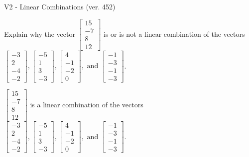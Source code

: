 \begin{exercise}
  \begin{exerciseTitle}V2 - Linear Combinations (ver. 452)\end{exerciseTitle}
  \begin{exerciseStatement}
    Explain why the vector \(\left[\begin{array}{c}
15 \\
-7 \\
8 \\
12
\end{array}\right]\)  is or is not a linear 
	combination of the vectors \(\left[\begin{array}{c}
-3 \\
2 \\
-4 \\
-2
\end{array}\right] , \left[\begin{array}{c}
-5 \\
1 \\
3 \\
-3
\end{array}\right] , \left[\begin{array}{c}
4 \\
-1 \\
-2 \\
0
\end{array}\right] , \text{ and } \left[\begin{array}{c}
-1 \\
-3 \\
-1 \\
-3
\end{array}\right]\).
	


  \end{exerciseStatement}
  \begin{exerciseAnswer}
   \(\left[\begin{array}{c}
15 \\
-7 \\
8 \\
12
\end{array}\right]\) 
  	 is  
	a linear combination of the vectors \(\left[\begin{array}{c}
-3 \\
2 \\
-4 \\
-2
\end{array}\right] , \left[\begin{array}{c}
-5 \\
1 \\
3 \\
-3
\end{array}\right] , \left[\begin{array}{c}
4 \\
-1 \\
-2 \\
0
\end{array}\right] , \text{ and } \left[\begin{array}{c}
-1 \\
-3 \\
-1 \\
-3
\end{array}\right]\).


\end{exerciseAnswer}
\end{exercise}
